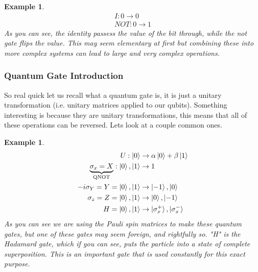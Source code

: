 \documentclass[12pt]{article}
\theoremstyle{plain}
\theoremstyle{nonumberplain}
\theoremstyle{plain}
\newtheorem{example}[lemma]{Example}
\theoremstyle{nonumberplain}
\newcommand\1{{\bf 1}}
\newcommand{\<}{\left\langle}
\renewcommand{\>}{\right\rangle}
\begin{document}
\begin{example}
\begin{equation}
\begin{split}
I: 0 \rightarrow 0\\
NOT: 0 \rightarrow 1
\end{split}
\end{equation}
As you can see, the identity passess the value of the bit through, while the not gate flips the value.  This may seem elementary at first but combining these into more complex systems can lead to large and very complex operations.  
\end{example}

\subsubsection{Quantum Gate Introduction}
So real quick let us recall what a quantum gate is, it is just a unitary transformation (i.e. unitary matrices applied to our qubits).  Something interesting is because they are unitary transformations, this means that all of these operations can be reversed.  Lets look at a couple common ones.

\begin{example}
\begin{equation}
\begin{split}
U: \ket{0} &\rightarrow \alpha\ket{0} + \beta\ket{1}\\
\underbrace{\sigma_x = X}_{\text{QNOT}}: \ket{0},\ket{1} &\rightarrow 1\\
-i\sigma_Y = Y =  \ket{0},\ket{1} &\rightarrow \ket{-1},\ket{0} \\
\sigma_z = Z =  \ket{0},\ket{1} &\rightarrow \ket{0},\ket{-1}\\
H =  \ket{0},\ket{1} &\rightarrow \ket{\sigma_x^+},\ket{\sigma_x^-} \\ 
\end{split}
\end{equation}
As you can see we are using the Pauli spin matrices to make these quantum gates, but one of these gates may seem foreign, and rightfully so. "H" is the Hadamard gate, which if you can see, puts the particle into a state of complete superposition.  This is an important gate that is used constantly for this exact purpose.   
\end{example} 

\pagebreak
\end{document}
